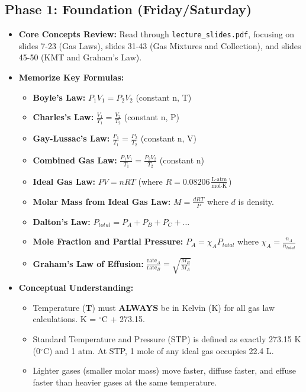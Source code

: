 \documentclass{article}
\begin{document}
\subsection{Phase 1: Foundation (Friday/Saturday)}
\begin{itemize}
    \item \textbf{Core Concepts Review:} Read through \texttt{lecture\_slides.pdf}, focusing on slides 7-23 (Gas Laws), slides 31-43 (Gas Mixtures and Collection), and slides 45-50 (KMT and Graham's Law).
    \item \textbf{Memorize Key Formulas:}
    \begin{itemize}
        \item \textbf{Boyle's Law:} $P_1V_1 = P_2V_2$ (constant n, T)
        \item \textbf{Charles's Law:} $\frac{V_1}{T_1} = \frac{V_2}{T_2}$ (constant n, P)
        \item \textbf{Gay-Lussac's Law:} $\frac{P_1}{T_1} = \frac{P_2}{T_2}$ (constant n, V)
        \item \textbf{Combined Gas Law:} $\frac{P_1V_1}{T_1} = \frac{P_2V_2}{T_2}$ (constant n)
        \item \textbf{Ideal Gas Law:} $PV = nRT$ (where $R = 0.08206 \frac{\text{L}\cdot\text{atm}}{\text{mol}\cdot\text{K}}$)
        \item \textbf{Molar Mass from Ideal Gas Law:} $M = \frac{dRT}{P}$ where $d$ is density.
        \item \textbf{Dalton's Law:} $P_{total} = P_A + P_B + P_C + \dots$
        \item \textbf{Mole Fraction and Partial Pressure:} $P_A = \chi_A P_{total}$ where $\chi_A = \frac{n_A}{n_{total}}$
        \item \textbf{Graham's Law of Effusion:} $\frac{\text{rate}_A}{\text{rate}_B} = \sqrt{\frac{M_B}{M_A}}$
    \end{itemize}
    \item \textbf{Conceptual Understanding:}
    \begin{itemize}
        \item Temperature (\textbf{T}) must \textbf{ALWAYS} be in Kelvin (K) for all gas law calculations. K = $^\circ$C + 273.15.
        \item Standard Temperature and Pressure (STP) is defined as exactly 273.15 K (0$^\circ$C) and 1 atm. At STP, 1 mole of any ideal gas occupies 22.4 L.
        \item Lighter gases (smaller molar mass) move faster, diffuse faster, and effuse faster than heavier gases at the same temperature.
    \end{itemize}
\end{itemize}
\end{document}

